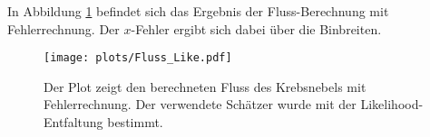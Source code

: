 In Abbildung \ref{fig:FlussLike} befindet sich das Ergebnis der Fluss-Berechnung mit Fehlerrechnung. Der $x$-Fehler ergibt sich dabei über die Binbreiten.
\begin{figure}
  \centering
  \texttt{[image: plots/Fluss\_Like.pdf]}
  \caption{Der Plot zeigt den berechneten Fluss des Krebsnebels mit Fehlerrechnung. Der verwendete Schätzer wurde mit der Likelihood-Entfaltung bestimmt.}
  \label{fig:FlussLike}
\end{figure}
